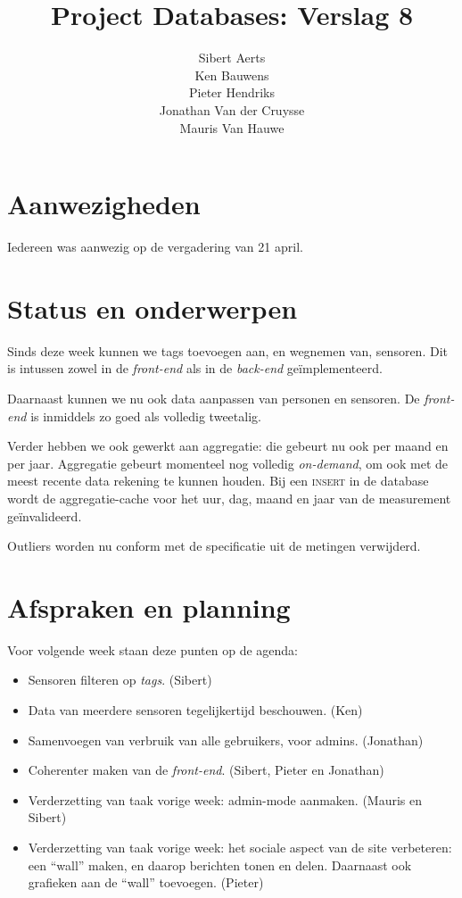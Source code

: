 \documentclass[10pt,a4paper]{article}
\author{Sibert Aerts\\
Ken Bauwens\\
Pieter Hendriks\\
Jonathan Van der Cruysse\\
Mauris Van Hauwe}
\title{Project Databases: Verslag 8}
\date{}
\begin{document}
  \maketitle
  \section{Aanwezigheden}
  Iedereen was aanwezig op de vergadering van 21 april. 
  
  \section{Status en onderwerpen}
  
  Sinds deze week kunnen we tags toevoegen aan, en wegnemen van, sensoren. Dit is intussen zowel in de \emph{front-end} als in de \emph{back-end} ge\"implementeerd.
  
  Daarnaast kunnen we nu ook data aanpassen van personen en sensoren. De \emph{front-end} is inmiddels zo goed als volledig tweetalig.
  
  Verder hebben we ook gewerkt aan aggregatie: die gebeurt nu ook per maand en per jaar. Aggregatie gebeurt momenteel nog volledig \emph{on-demand}, om ook met de meest recente data rekening te kunnen houden. Bij een \textsc{insert} in de database wordt de aggregatie-cache voor het uur, dag, maand en jaar van de measurement ge\"invalideerd.
  
  Outliers worden nu conform met de specificatie uit de metingen verwijderd.
  
  \section{Afspraken en planning}
  Voor volgende week staan deze punten op de agenda:
  
  \begin{itemize}
  	
  	\item Sensoren filteren op \emph{tags}. (Sibert)
  	
  	\item Data van meerdere sensoren tegelijkertijd beschouwen. (Ken)
  	
  	\item Samenvoegen van verbruik van alle gebruikers, voor admins. (Jonathan)
  	
  	\item Coherenter maken van de \emph{front-end}. (Sibert, Pieter en Jonathan)
  	
  	\item Verderzetting van taak vorige week: admin-mode aanmaken. (Mauris en Sibert)
  	
  	\item Verderzetting van taak vorige week: het sociale aspect van de site verbeteren: een ``wall'' maken, en daarop berichten tonen en delen. Daarnaast ook grafieken aan de ``wall'' toevoegen. (Pieter)
  	
  \end{itemize}
  
\end{document}
